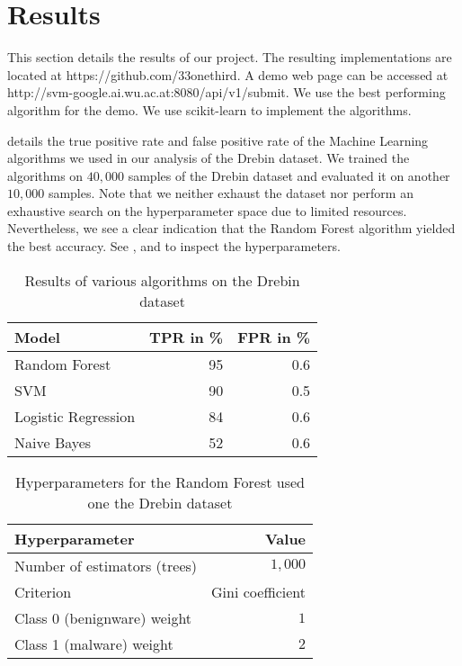 \section{Results}
This section details the results of our project. The resulting implementations are located at https://github.com/33onethird. A demo web page can be accessed at http://svm-google.ai.wu.ac.at:8080/api/v1/submit. We use the best performing algorithm for the demo. We use scikit-learn \cite{scikit-learn} to implement the algorithms.

 details the true positive rate and false positive rate of the Machine Learning algorithms we used in our analysis of the Drebin dataset. We trained the algorithms on $40,000$ samples of the Drebin dataset and evaluated it on another $10,000$ samples. Note that we neither exhaust the dataset nor perform an exhaustive search on the hyperparameter space due to limited resources. Nevertheless, we see a clear indication that the Random Forest algorithm yielded the best accuracy. See ,  and  to inspect the hyperparameters.
\begin{table}[p]
	\centering
	\begin{tabular}{l r r}
		Model & TPR in \% & FPR in \%\\
		\hline
		Random Forest & 95 & 0.6\\
		SVM & 90 & 0.5\\
		Logistic Regression & 84 & 0.6\\
		Naive Bayes & 52 & 0.6\\
		\hline
	\end{tabular}
	\caption{Results of various algorithms on the Drebin dataset}
	\label{tab:resdreb}
\end{table}

\begin{table}[p]
	\centering
	\begin{tabular}{l r}
		Hyperparameter & Value \\
		\hline
		Number of estimators (trees) & $1,000$\\
		Criterion & Gini coefficient\\
		Class 0 (benignware) weight & $1$\\
		Class 1 (malware) weight & $2$\\
		\hline
	\end{tabular}
	\caption{Hyperparameters for the Random Forest used one the Drebin dataset}
	\label{tab:rfdrebin}
\end{table}

